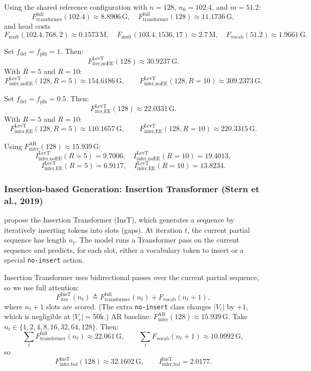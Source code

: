 \documentclass[11pt]{article}
\newcommand{\G}{\mathrm{G}} %
\newcommand{\M}{\mathrm{M}} %
\begin{document}
Using the shared reference configuration with $n=128$, $n_0=102.4$, and $m=51.2$:
\[
F_{\text{transformer}}^{\text{full}}(102.4)\approx \num{8.8906}\,\G,\quad
F_{\text{transformer}}^{\text{full}}(128)\approx \num{11.1736}\,\G,
\]
and head costs
\[
F_{\text{mult}}(102.4,768,2)\approx \num{0.1573}\,\M,\quad
F_{\text{mult}}(103.4,1536,17)\approx \num{2.7}\,\M,\quad
F_{\text{vocab}}(51.2)\approx \num{1.9661}\,\G.
\]

Set $f_{\text{del}}=f_{\text{plh}}=1$. Then:
\[
F_{\text{iter,noEE}}^{\text{LevT}}(128)\approx \num{30.9237}\,\G.
\]
With $R=5$ and $R=10$:
\[
F_{\text{infer,noEE}}^{\text{LevT}}(128,R=5)\approx \num{154.6186}\,\G,\qquad
F_{\text{infer,noEE}}^{\text{LevT}}(128,R=10)\approx \num{309.2373}\,\G.
\]

Set $f_{\text{del}}=f_{\text{plh}}=0.5$. Then:
\[
F_{\text{iter,EE}}^{\text{LevT}}(128)\approx \num{22.0331}\,\G.
\]
With $R=5$ and $R=10$:
\[
F_{\text{infer,EE}}^{\text{LevT}}(128,R=5)\approx \num{110.1657}\,\G,\qquad
F_{\text{infer,EE}}^{\text{LevT}}(128,R=10)\approx \num{220.3315}\,\G.
\]

Using $F_{\text{infer}}^{\text{AR}}(128)\approx \num{15.939}\,\G$:
\[
I_{\text{infer,noEE}}^{\text{LevT}}(R=5)=\num{9.7006},
\quad
I_{\text{infer,noEE}}^{\text{LevT}}(R=10)=\num{19.4013},
\]
\[
I_{\text{infer,EE}}^{\text{LevT}}(R=5)=\num{6.9117},
\quad
I_{\text{infer,EE}}^{\text{LevT}}(R=10)=\num{13.8234}.
\]

\subsubsection{Insertion-based Generation: Insertion Transformer (Stern et al., 2019)}
\citet{stern2019insertion} propose the Insertion Transformer (InsT), which generates a sequence by iteratively inserting tokens into slots (gaps). At iteration $t$, the current partial sequence has length $n_t$. The model runs a Transformer pass on the current sequence and predicts, for each slot, either a vocabulary token to insert or a special \texttt{no-insert} action.

Insertion Transformer uses bidirectional passes over the current partial sequence, so we use full attention:
\[
F_{\text{iter}}^{\text{InsT}}(n_t)
\triangleq
F_{\text{transformer}}^{\text{full}}(n_t)
+
F_{\text{vocab}}(n_t+1),
\]
where $n_t+1$ slots are scored. (The extra \texttt{no-insert} class changes $|V_c|$ by $+1$, which is negligible at $|V_c|=50\text{k}$.)
AR baseline: $F_{\text{infer}}^{\text{AR}}(128)\approx \num{15.939}\,\G$.
Take $n_t\in\{1,2,4,8,16,32,64,128\}$. Then:
\[
\sum_t F_{\text{transformer}}^{\text{full}}(n_t)\approx \num{22.061}\,\G,\qquad
\sum_t F_{\text{vocab}}(n_t+1)\approx \num{10.0992}\,\G,
\]
so
\[
F_{\text{infer,bal}}^{\text{InsT}}(128)\approx \num{32.1602}\,\G,\qquad
I_{\text{infer,bal}}^{\text{InsT}}=\num{2.0177}.
\]
\end{document}
